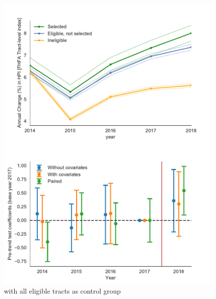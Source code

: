\documentclass[10pt]{article}
\begin{document}
\begin{figure}[tb]
    \centering
    \includegraphics{../exhibits/zillow_raw_trend_lic_only_false.pdf}
    
    \includegraphics{../exhibits/zillow_pretest_event_study_plot_lic_only_false.pdf}

    \caption{ with all eligible
    tracts as control group}
    \label{fig:appendix_fig}
\end{figure}
\end{document}
